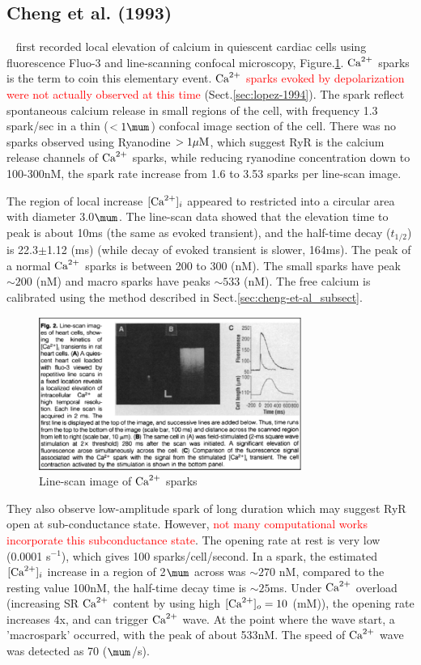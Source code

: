 \subsection{Cheng et al. (1993)}
\label{sec:spark_cheng1993}

~\citep{cheng1993cse} first recorded local elevation of calcium in quiescent
cardiac cells using fluorescence Fluo-3 and line-scanning confocal microscopy,
Figure.\ref{fig:spark_Cheng1993}. ${\text{Ca}^{2+}}$ sparks is the term to coin this
elementary event. \textcolor{red}{${\text{Ca}^{2+}}$ sparks evoked by depolarization were not
actually observed at this time} (Sect.\ref{sec:lopez-1994}).
The spark reflect spontaneous calcium release in small regions of the cell, with
frequency 1.3 spark/sec in a thin ($<1\mum$) confocal image section of the cell.
There was no sparks observed using Ryanodine $>1{\mu\text{M}}$, which suggest RyR is the
calcium release channels of ${\text{Ca}^{2+}}$ sparks, while reducing ryanodine concentration
down to 100-300nM, the spark rate increase from 1.6 to 3.53 sparks per line-scan
image.

The region of local increase $[{\text{Ca}^{2+}}]_i$ appeared to restricted into a circular
area with diameter 3.0$\mum$. The line-scan data showed that the elevation time
to peak is about 10ms (the same as evoked transient), and the half-time decay
($t_{1/2}$) is 22.3$\pm$1.12 (ms) (while decay of evoked transient is slower,
164ms). The peak of a normal ${\text{Ca}^{2+}}$ sparks is between 200 to 300 (nM). The small
sparks have peak $\sim 200$ (nM) and macro sparks have peaks $\sim 533$ (nM).
The free calcium is calibrated using the method described in
Sect.\ref{sec:cheng-et-al_subsect}.

\begin{figure}[hbt]
  \centerline{\includegraphics[height=5cm,
    angle=0]{./images/spark_Cheng1993.eps}}
\caption{Line-scan image of ${\text{Ca}^{2+}}$ sparks}
\label{fig:spark_Cheng1993}
\end{figure}

They also observe low-amplitude spark of long duration which may suggest RyR
open at sub-conductance state. However, \textcolor{red}{not many computational
works incorporate this subconductance state}. The opening rate at rest is very
low (0.0001 s$^{-1}$), which gives 100 sparks/cell/second. In a spark, the
estimated $[{\text{Ca}^{2+}}]_i$ increase in a region of 2$\mum$ across was $\sim 270$ nM,
compared to the resting value 100nM, the half-time decay time is $\sim 25$ms.
Under ${\text{Ca}^{2+}}$ overload (increasing SR ${\text{Ca}^{2+}}$ content by using high $[{\text{Ca}^{2+}}]_o=10$
(mM)), the opening rate increases 4x, and can trigger ${\text{Ca}^{2+}}$ wave. At the
point where the wave start, a 'macrospark' occurred, with the peak of about
533nM. The speed of ${\text{Ca}^{2+}}$ wave was detected as 70 ($\mum$/s).

